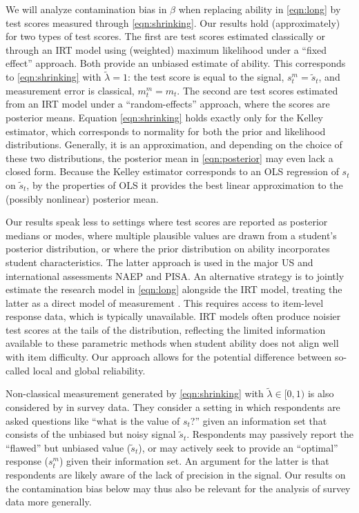 We will analyze contamination bias in $\beta$ when replacing ability in \eqref{eqn:long} by test scores measured through \eqref{eqn:shrinking}. Our results hold (approximately) for two types of test scores. The first are test scores estimated classically or through an IRT model using (weighted) maximum likelihood under a “fixed effect” approach. Both provide an unbiased estimate of ability. This corresponds to \eqref{eqn:shrinking} with $\widetilde{\lambda}=1$: the test score is equal to the signal, $s^m_t=\widetilde{s}_t$, and measurement error is classical, $m^{m}_t=m_t$.  The second are test scores estimated from an IRT model under a “random-effects” approach, where the scores are posterior means. Equation \eqref{eqn:shrinking} holds exactly only for the Kelley estimator, which corresponds to normality for both the prior and likelihood distributions. Generally, it is an approximation, and depending on the choice of these two distributions, the posterior mean in \eqref{eqn:posterior} may even lack a closed form. Because the Kelley estimator corresponds to an OLS regression of $s_t$ on $\widetilde{s}_t$, by the properties of OLS it provides the best linear approximation to the (possibly nonlinear) posterior mean. 

Our results speak less to settings where test scores are reported as posterior medians or modes, where multiple plausible values are drawn from a student’s posterior distribution, or where the prior distribution on ability incorporates student characteristics. The latter approach is used in the major US and international assessments NAEP and PISA. An alternative strategy is to jointly estimate the research model in \eqref{eqn:long} alongside the IRT model, treating the latter as a direct model of measurement \citep{junker2012use}. This requires access to item-level response data, which is typically unavailable. IRT models often produce noisier test scores at the tails of the distribution, reflecting the limited information available to these parametric methods when student ability does not align well with item difficulty. Our approach allows for the potential difference between so-called local and global reliability.

Non-classical measurement generated by \eqref{eqn:shrinking} with $\widetilde{\lambda} \in [0,1)$ is also considered by \cite{hyslop2001bias} in survey data. They consider a setting in which respondents are asked questions like ``what is the value of $s_t$?'' given an information set that consists of the unbiased but noisy signal $\widetilde{s}_t$. Respondents may passively report the ``flawed'' but unbiased value ($\widetilde{s}_t$), or may actively seek to provide an ``optimal'' response ($s^m_t$) given their information set. An argument for the latter is that respondents are likely aware of the lack of precision in the signal. Our results on the contamination bias below may thus also be relevant for the analysis of survey data more generally.

